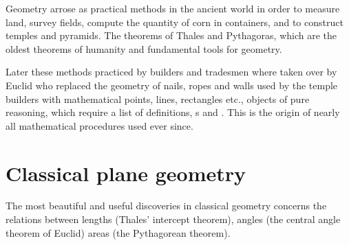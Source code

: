 Geometry arrose as practical methods in the ancient world in order to measure land, survey fields, compute the quantity of corn in containers, and to construct temples and pyramids. The theorems of Thales and Pythagoras, which are the oldest theorems of humanity and fundamental tools for geometry.

Later these methods practiced by builders and tradesmen where taken over by Euclid who replaced the geometry of nails, ropes and walls used by the temple builders with mathematical points, lines, rectangles etc., objects of pure reasoning, which require a list of definitions, s and . This is the origin of nearly all mathematical procedures used ever since.

\section{Classical plane geometry}
The most beautiful and useful discoveries in classical geometry concerns the relations between lengths (Thales’ intercept theorem), angles (the central angle theorem of Euclid) areas (the Pythagorean theorem).

